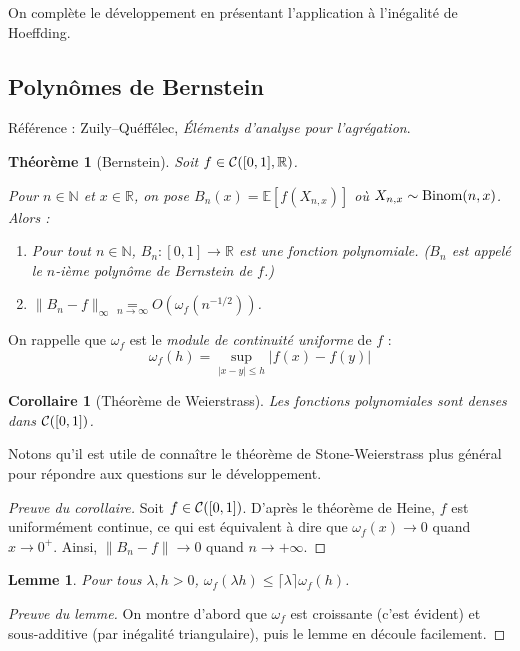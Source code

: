 \documentclass[a4paper, 11pt]{article}
\def\N{\mathbb{N}}
\def\R{\mathbb{R}}
\def\Cf{{\cal{C}}}
\def\E{\mathbb{E}}
\newtheorem*{theorem}{Théorème}
\newtheorem*{lemma}{Lemme}
\newtheorem*{corollary}{Corollaire}
\begin{document}
On complète le développement en présentant l'application à l'inégalité de
Hoeffding.

\newpage

\subsection{Polynômes de Bernstein}

Référence : Zuily--Quéffélec, \emph{Éléments d'analyse pour l'agrégation}.

\begin{theorem}[Bernstein]
  Soit $f \in \Cf([0,1], \R)$.
  
  Pour $n \in \N$ et $x \in \R$, on pose $B_n(x) = \E[f(X_{n,x})]$ où $X_{n,x}
  \sim \textnormal{Binom}(n,x)$. Alors :
  \begin{enumerate}
  \item Pour tout $n \in \N$, $B_n : [0,1] \to \R$ est une fonction polynomiale.
    ($B_n$ est appelé le $n$-ième polynôme de Bernstein de $f$.)
  \item $\|B_n - f\|_\infty \underset{n \to \infty}{=} O\left(
      \omega_f(n^{-1/2}) \right)$.
  \end{enumerate}
\end{theorem}

On rappelle que $\omega_f$ est le \emph{module de continuité uniforme} de $f$ :
\[ \omega_f(h) = \sup_{|x-y| \leq h} |f(x) - f(y)| \]

\begin{corollary}[Théorème de Weierstrass]
  Les fonctions polynomiales sont denses dans $\Cf([0,1])$.
\end{corollary}

Notons qu'il est utile de connaître le théorème de Stone-Weierstrass plus
général pour répondre aux questions sur le développement.

\begin{proof}[Preuve du corollaire]
  Soit $f \in \Cf([0,1])$. D'après le théorème de Heine, $f$ est uniformément
  continue, ce qui est équivalent à dire que $\omega_f(x) \to 0$ quand $x \to
  0^+$. Ainsi, $\|B_n - f\| \to 0$ quand $n \to +\infty$.
\end{proof}

\begin{lemma}
  Pour tous $\lambda, h > 0$,
  $\omega_f(\lambda h) \leq \lceil \lambda \rceil \omega_f(h)$.
\end{lemma}
\begin{proof}[Preuve du lemme]
  On montre d'abord que $\omega_f$ est croissante (c'est évident) et
  sous-additive (par inégalité triangulaire), puis le lemme en découle
  facilement.
\end{proof}
\end{document}
